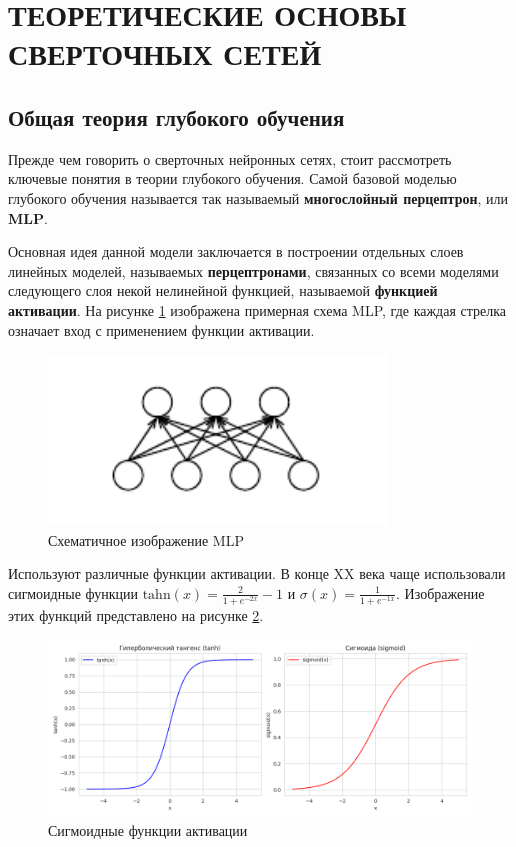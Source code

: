 \section{ТЕОРЕТИЧЕСКИЕ ОСНОВЫ СВЕРТОЧНЫХ СЕТЕЙ}

\subsection{Общая теория глубокого обучения}

Прежде чем говорить о сверточных нейронных сетях, стоит рассмотреть ключевые понятия в теории глубокого обучения.
Самой базовой моделью глубокого обучения называется так называемый \textbf{многослойный перцептрон}, или \textbf{MLP}.

Основная идея данной модели заключается в построении отдельных слоев линейных моделей, называемых \textbf{перцептронами}, связанных со всеми моделями следующего слоя некой нелинейной функцией,
называемой \textbf{функцией активации}. На рисунке \ref{fig:mlp} изображена примерная схема MLP, где каждая стрелка означает вход с применением функции активации.

\begin{figure}[h]
    \centering
    \includegraphics[width=0.8\textwidth]{images/mlp.pdf}
    \caption{Схематичное изображение MLP}
    \label{fig:mlp}
\end{figure}

Используют различные функции активации.
В конце XX века чаще использовали сигмоидные функции $\text{tahn}(x) = \frac{2}{1 + e^{-2x}} - 1$ и $\sigma(x) = \frac{1}{1 + e^{-1x}}$.
Изображение этих функций представлено на рисунке \ref{fig:sigmoids}.

\newpage
\begin{figure}[h]
    \centering
    \includegraphics[width=1.0\textwidth]{images/sigmoids.png}
    \caption{Сигмоидные функции активации}
    \label{fig:sigmoids}
\end{figure}

